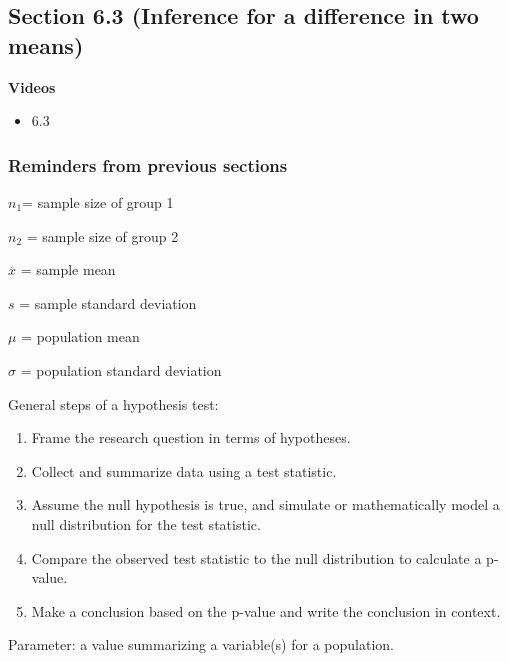 \documentclass[
]{report}
\providecommand{\tightlist}{%
  \setlength{\itemsep}{0pt}\setlength{\parskip}{0pt}}
\begin{document}
\hypertarget{section-6.3-inference-for-a-difference-in-two-means}{%
\subsection*{Section 6.3 (Inference for a difference in two means)}\label{section-6.3-inference-for-a-difference-in-two-means}}

\textbf{Videos}

\begin{itemize}
\tightlist
\item
  6.3
\end{itemize}


\hypertarget{reminders-from-previous-sections-6}{%
\subsubsection*{Reminders from previous sections}\label{reminders-from-previous-sections-6}}

\(n_1\)= sample size of group 1

\(n_2\) = sample size of group 2

\(\overline{x}\) = sample mean

\(s\) = sample standard deviation

\(\mu\) = population mean

\(\sigma\) = population standard deviation

General steps of a hypothesis test:

\begin{enumerate}
\def\labelenumi{\arabic{enumi}.}
\item
  Frame the research question in terms of hypotheses.
\item
  Collect and summarize data using a test statistic.
\item
  Assume the null hypothesis is true, and simulate or mathematically model a null distribution for the test statistic.
\item
  Compare the observed test statistic to the null distribution to calculate a p-value.
\item
  Make a conclusion based on the p-value and write the conclusion in context.
\end{enumerate}

Parameter: a value summarizing a variable(s) for a population.
\end{document}
